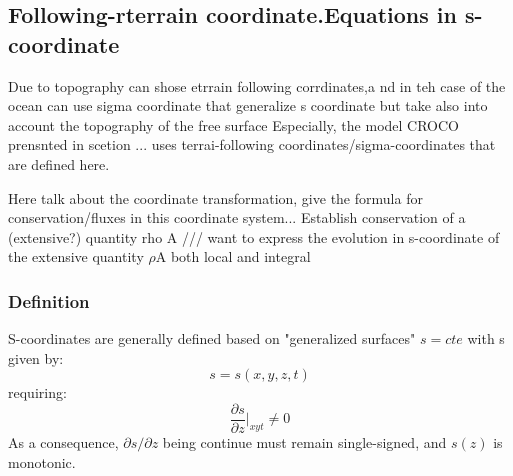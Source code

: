  \subsection{Following-rterrain coordinate.Equations in s-coordinate}
 
 Due to topography can shose etrrain following corrdinates,a nd in teh case of the ocean can use sigma coordinate that generalize s coordinate but take also into account the topography of the free surface
 Especially, the model CROCO prensnted in scetion ... uses terrai-following coordinates/sigma-coordinates that are defined here.
 
 
 Here talk about the coordinate transformation, give the formula for conservation/fluxes in this coordinate system... Establish conservation of a (extensive?) quantity rho A   /// want to express the evolution in s-coordinate of the extensive quantity $\rho$A both local and integral
 
 
\subsubsection{Definition}
S-coordinates are generally defined based on "generalized surfaces" $s=cte$ with s given by:
\begin{equation}
 \displaystyle
 s=s(x,y,z,t)
\end{equation}
requiring:
\begin{equation}
 \displaystyle
 \frac{\partial s}{\partial z}\bigg\vert_{xyt}\ne 0
\end{equation}
As a consequence, $\partial s / \partial z$ being continue must remain single-signed, and $s(z)$ is monotonic.

